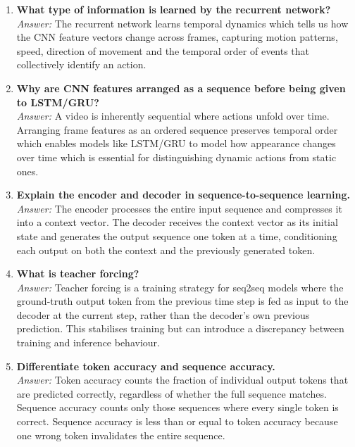 \documentclass[10pt]{article}
\begin{document}
\begin{enumerate}
\item \textbf{What type of information is learned by the recurrent network?}\\
\textit{Answer:} The recurrent network learns temporal dynamics which tells us how the CNN feature vectors change across frames, capturing motion patterns, speed, direction of movement and the temporal order of events that collectively identify an action.\\
\vspace{8mm}

\item \textbf{Why are CNN features arranged as a sequence before being given to LSTM/GRU?}\\
\textit{Answer:} A video is inherently sequential where actions unfold over time. Arranging frame features as an ordered sequence preserves temporal order which enables models like LSTM/GRU to model how appearance changes over time which is essential for distinguishing dynamic actions from static ones.\\
\vspace{8mm}

\item \textbf{Explain the encoder and decoder in sequence-to-sequence learning.}\\
\textit{Answer:} The encoder processes the entire input sequence and compresses it into a context vector. The decoder receives the context vector as its initial state and generates the output sequence one token at a time, conditioning each output on both the context and the previously generated token.\\
\vspace{8mm}

\item \textbf{What is teacher forcing?}\\
\textit{Answer:} Teacher forcing is a training strategy for seq2seq models where the ground-truth output token from the previous time step is fed as input to the decoder at the current step, rather than the decoder's own previous prediction. This stabilises training but can introduce a discrepancy between training and inference behaviour.\\
\vspace{8mm}

\item \textbf{Differentiate token accuracy and sequence accuracy.}\\
\textit{Answer:} Token accuracy counts the fraction of individual output tokens that are predicted correctly, regardless of whether the full sequence matches. Sequence accuracy counts only those sequences where every single token is correct. Sequence accuracy is less than or equal to token accuracy because one wrong token invalidates the entire sequence.\\
\vspace{8mm}


\end{enumerate}
\end{document}
